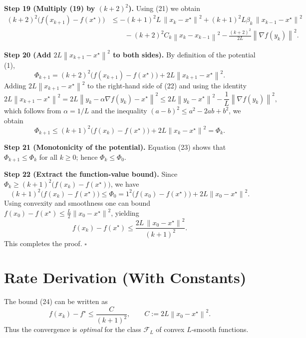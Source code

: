 \documentclass{article}
\newcommand{\norm}[1]{\left\lVert#1\right\rVert}
\begin{document}
\bigskip
\noindent\textbf{Step 19 (Multiply (19) by $(k+2)^2$).} Using (21) we obtain
\[
\begin{aligned}
(k+2)^2\bigl(f(x_{k+1})-f(x^\star)\bigr)
 &\le -(k+1)^2 L\,\norm{x_k-x^\star}^2
    +(k+1)^2 L\beta_k\,\norm{x_{k-1}-x^\star}^2 \\
 &\qquad -(k+2)^2 C_k \norm{x_k-x_{k-1}}^2
    -\frac{(k+2)^2}{2L}\norm{\nabla f(y_k)}^2 .
\end{aligned}
\tag{22}
\]

\bigskip
\noindent\textbf{Step 20 (Add $2L\norm{x_{k+1}-x^\star}^2$ to both sides).} By definition of the potential (1),
\[
\Phi_{k+1}= (k+2)^2\bigl(f(x_{k+1})-f(x^\star)\bigr)+2L\norm{x_{k+1}-x^\star}^2 .
\]
Adding $2L\norm{x_{k+1}-x^\star}^2$ to the right‑hand side of (22) and using the identity
\[
2L\norm{x_{k+1}-x^\star}^2
   =2L\norm{y_k-\alpha\nabla f(y_k)-x^\star}^2
   \le 2L\norm{y_k-x^\star}^2
        -\frac{1}{L}\norm{\nabla f(y_k)}^2,
\]
which follows from $\alpha=1/L$ and the inequality $(a-b)^2\le a^2-2ab+b^2$, we obtain
\[
\Phi_{k+1}\le (k+1)^2\bigl(f(x_k)-f(x^\star)\bigr)+2L\norm{x_k-x^\star}^2 = \Phi_k .
\tag{23}
\]

\bigskip
\noindent\textbf{Step 21 (Monotonicity of the potential).} Equation (23) shows that $\Phi_{k+1}\le\Phi_k$ for all $k\ge0$; hence $\Phi_k\le\Phi_0$.

\bigskip
\noindent\textbf{Step 22 (Extract the function‑value bound).} Since $\Phi_k\ge (k+1)^2\bigl(f(x_k)-f(x^\star)\bigr)$, we have
\[
(k+1)^2\bigl(f(x_k)-f(x^\star)\bigr)
   \le \Phi_0
   = 1^2\bigl(f(x_0)-f(x^\star)\bigr)+2L\norm{x_0-x^\star}^2 .
\]
Using convexity and smoothness one can bound $f(x_0)-f(x^\star)\le \frac{L}{2}\norm{x_0-x^\star}^2$, yielding
\[
f(x_k)-f(x^\star) \le \frac{2L\,\norm{x_0-x^\star}^2}{(k+1)^2}.
\tag{24}
\]
This completes the proof. $\square$

\section*{Rate Derivation (With Constants)}
The bound (24) can be written as
\[
f(x_k)-f^\star \le \frac{C}{(k+1)^2},
\qquad C:=2L\norm{x_0-x^\star}^2 .
\]
Thus the convergence is \emph{optimal} for the class $\mathcal{F}_{L}$ of convex $L$‑smooth functions.
\end{document}
